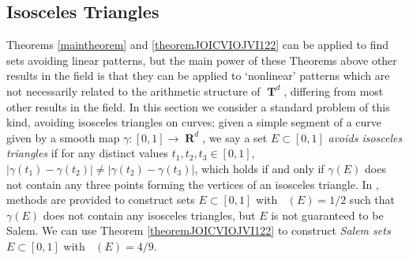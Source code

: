\documentclass[dvipsnames,letterpaper,12pt]{article}
\numberwithin{equation}{section}
\DeclareMathOperator{\hausdim}{\dim_{\mathbf{H}}}
\DeclareMathOperator{\fordim}{\dim_{\mathbf{F}}}
\DeclareMathOperator{\RR}{\mathbf{R}}
\DeclareMathOperator{\TT}{\mathbf{T}}
\numberwithin{theorem}{section}
\begin{document}
\subsection{Isosceles Triangles}

Theorems \ref{maintheorem} and \ref{theoremJOICVIOJVI122} can be applied to find sets avoiding linear patterns, but the main power of these Theorems above other results in the field is that they can be applied to `nonlinear' patterns which are not necessarily related to the arithmetic structure of $\TT^d$, differing from most other results in the field. In this section we consider a standard problem of this kind, avoiding isosceles triangles on curves; given a simple segment of a curve given by a smooth map $\gamma : [0,1] \to \RR^d$, we say a set $E \subset [0,1]$ \emph{avoids isosceles triangles} if for any distinct values $t_1,t_2,t_3 \in [0,1]$, $|\gamma(t_1) - \gamma(t_2)| \neq |\gamma(t_2) - \gamma(t_3)|$, which holds if and only if $\gamma(E)$ does not contain any three points forming the vertices of an  isosceles triangle. In \cite{PramanikFraser}, methods are provided to construct sets $E \subset [0,1]$ with $\hausdim(E) = 1/2$ such that $\gamma(E)$ does not contain any isosceles triangles, but $E$ is not guaranteed to be Salem. We can use Theorem \ref{theoremJOICVIOJVI122} to construct \emph{Salem sets} $E \subset [0,1]$ with $\fordim(E) = 4/9$.
\end{document}
